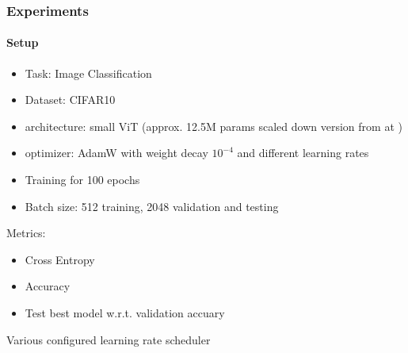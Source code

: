 \documentclass[10pt,aspectratio=169]{beamer}
\begin{document}
    \begin{frame}
        \frametitle{Experiments}
        \framesubtitle{Setup}
        \begin{itemize}
            \item Task: Image Classification 
            \item Dataset: CIFAR10 \cite{krizhevsky2009learning}
            \item architecture: small ViT (approx. 12.5M params scaled down version from \cite{dosovitskiy2020image} at \cite{ViTCIFAR})
            \item optimizer: AdamW with weight decay $10^{-4}$ and different learning rates  \cite{loshchilov2017decoupled}
            \item Training for 100 epochs
            \item Batch size: 512 training, 2048 validation and testing
        \end{itemize}
        Metrics:
        \begin{itemize}
            \item Cross Entropy
            \item Accuracy
            \item Test best model w.r.t. validation accuary
        \end{itemize}
        Various configured learning rate scheduler
    \end{frame}
    
\end{document}
